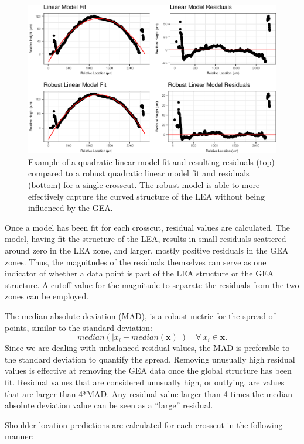 \documentclass[]{article}
\begin{document}
\begin{figure}
\centering
\includegraphics{writeup_files/figure-latex/unnamed-chunk-3-1.pdf}
\caption{Example of a quadratic linear model fit and resulting residuals
(top) compared to a robust quadratic linear model fit and residuals
(bottom) for a single crosscut. The robust model is able to more
effectively capture the curved structure of the LEA without being
influenced by the GEA.}
\end{figure}

Once a model has been fit for each crosscut, residual values are
calculated. The model, having fit the structure of the LEA, results in
small residuals scattered around zero in the LEA zone, and larger,
mostly positive residuals in the GEA zones. Thus, the magnitudes of the
residuals themselves can serve as one indicator of whether a data point
is part of the LEA structure or the GEA structure. A cutoff value for
the magnitude to separate the residuals from the two zones can be
employed.

The median absolute deviation (MAD), is a robust metric for the spread
of points, similar to the standard deviation:
\[median(|x_i- median(\mathbf{x})|) \quad \forall\ x_i \in \mathbf{x}.\]
Since we are dealing with unbalanced residual values, the MAD is
preferable to the standard deviation to quantify the spread. Removing
unusually high residual values is effective at removing the GEA data
once the global structure has been fit. Residual values that are
considered unusually high, or outlying, are values that are larger than
4*MAD. Any residual value larger than 4 times the median absolute
deviation value can be seen as a ``large'' residual.

Shoulder location predictions are calculated for each crosscut in the
following manner:\\
\end{document}
